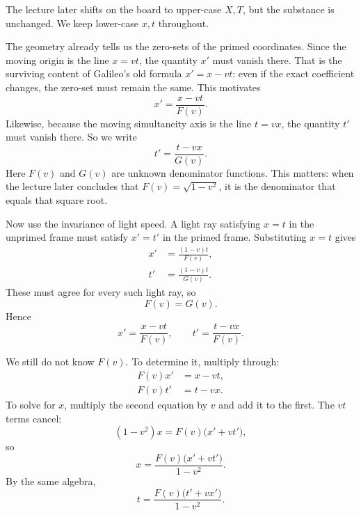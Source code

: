 The lecture later shifts on the board to upper-case \(X,T\), but the substance is unchanged. We keep lower-case \(x,t\) throughout.

The geometry already tells us the zero-sets of the primed coordinates. Since the moving origin is the line \(x=vt\), the quantity \(x'\) must vanish there. That is the surviving content of Galileo's old formula \(x'=x-vt\): even if the exact coefficient changes, the zero-set must remain the same. This motivates
\begin{equation}
x'=\frac{x-vt}{F(v)}.
\end{equation}
Likewise, because the moving simultaneity axis is the line \(t=vx\), the quantity \(t'\) must vanish there. So we write
\begin{equation}
t'=\frac{t-vx}{G(v)}.
\end{equation}
Here \(F(v)\) and \(G(v)\) are unknown denominator functions. This matters: when the lecture later concludes that \(F(v)=\sqrt{1-v^2}\), it is the denominator that equals that square root.

Now use the invariance of light speed. A light ray satisfying \(x=t\) in the unprimed frame must satisfy \(x'=t'\) in the primed frame. Substituting \(x=t\) gives
\begin{align}
x' &= \frac{(1-v)t}{F(v)}, \\
t' &= \frac{(1-v)t}{G(v)}.
\end{align}
These must agree for every such light ray, so
\begin{equation}
F(v)=G(v).
\end{equation}
Hence
\begin{equation}
x'=\frac{x-vt}{F(v)},\qquad t'=\frac{t-vx}{F(v)}.
\end{equation}

We still do not know \(F(v)\). To determine it, multiply through:
\begin{align}
F(v)x' &= x-vt, \\
F(v)t' &= t-vx.
\end{align}
To solve for \(x\), multiply the second equation by \(v\) and add it to the first. The \(vt\) terms cancel:
\begin{equation}
(1-v^2)x=F(v)\bigl(x'+vt'\bigr),
\end{equation}
so
\begin{equation}
x=\frac{F(v)\bigl(x'+vt'\bigr)}{1-v^2}.
\end{equation}
By the same algebra,
\begin{equation}
t=\frac{F(v)\bigl(t'+vx'\bigr)}{1-v^2}.
\end{equation}

